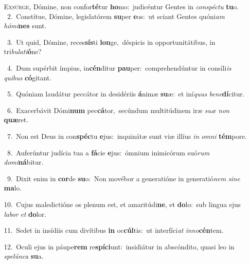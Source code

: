\lettrine{\initial\textcolor{\initialcolor}{E}}{xsúrge,} Dómine, non confor\-\textbf{té}\-tur \textbf{ho}\-mo:~\star judicéntur Gentes in \textit{con}\-\textit{spéc}\textit{tu} \textbf{tu}\-o.\\
{\numbfont\textcolor{\numbcolor}{~2.}}~Constítue, Dómine, legislatórem \textbf{su}\-per \textbf{e}\-os:~\star ut sciant Gentes quóni\textit{am} \textit{hó}\-\textit{mi}\textbf{nes} sunt.\par
{\numbfont\textcolor{\numbcolor}{~3.}}~Ut quid, Dómine, reces\-\textbf{sís}\-ti \textbf{lon}\-ge,~\star déspicis in opportunitátibus, in tri\-\textit{bu}\-\textit{la}\textit{ti}\textbf{ó}ne?\par
{\numbfont\textcolor{\numbcolor}{~4.}}~Dum supérbit ímpius, in\-\textbf{cén}\-ditur \textbf{pau}\-per:~\star comprehendúntur in consíli\textit{is} \textit{qui}\-\textit{bus} \textbf{có}\-gitant.\par
{\numbfont\textcolor{\numbcolor}{~5.}}~Quóniam laudátur peccátor in desidériis \textbf{á}\-nimæ \textbf{su}\-æ:~\star et iní\textit{quus} \textit{be}\-\textit{ne}\textbf{dí}citur.\par
{\numbfont\textcolor{\numbcolor}{~6.}}~Exacerbávit Dómi\textbf{num} pec\-\textbf{cá}\-tor,~\star secúndum multitúdinem iræ \textit{su}\-\textit{æ} \textit{non} \textbf{quæ}\-ret.\par
{\numbfont\textcolor{\numbcolor}{~7.}}~Non est Deus in con\-\textbf{spéc}\-tu \textbf{e}\-jus:~\star inquinátæ sunt viæ illíus \textit{in} \textit{om}\-\textit{ni} \textbf{tém}\-pore.\par
{\numbfont\textcolor{\numbcolor}{~8.}}~Auferúntur judícia tua a \textbf{fá}\-cie \textbf{e}\-jus:~\star ómnium inimicórum suó\textit{rum} \textit{do}\-\textit{mi}\textbf{ná}bitur.\par
{\numbfont\textcolor{\numbcolor}{~9.}}~Dixit enim in \textbf{cor}\-de \textbf{su}\-o:~\star Non movébor a generatióne in generatió\textit{nem} \textit{si}\-\textit{ne} \textbf{ma}\-lo.\par
{\numbfont\textcolor{\numbcolor}{10.}}~Cujus maledictióne os plenum est, et amaritúdi\-\textbf{ne}\-, et \textbf{do}\-lo:~\star sub lingua ejus \textit{la}\-\textit{bor} \textit{et} \textbf{do}\-lor.\par
{\numbfont\textcolor{\numbcolor}{11.}}~Sedet in insídiis cum divítibus \textbf{in} oc\-\textbf{cúl}\-tis:~\star ut interfíci\textit{at} \textit{in}\-\textit{no}\textbf{cén}tem.\par
{\numbfont\textcolor{\numbcolor}{12.}}~Oculi ejus in páupe\textbf{rem} re\-\textbf{spí}\-\textbf{ci}unt:~\star insidiátur in abscóndito, quasi leo in \textit{spe}\-\textit{lún}\textit{ca} \textbf{su}\-a.\par
